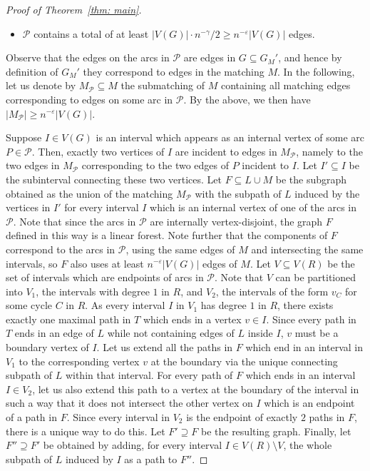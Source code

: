 \documentclass[11pt,reqno]{article}
\newenvironment{claimproof}[1][\proofname]{\proof[#1]\renewcommand{\qedsymbol}{$\blacksquare$}}{\endproof}
\begin{document}
\begin{proof}[Proof of Theorem~\ref{thm: main}]
\begin{claimproof}
\begin{itemize}
        \item $\mathcal P$ contains a total of at least $|V(G)|\cdot n^{-\gamma}/2\geq n^{-\varepsilon}|V(G)|$ edges.
    \end{itemize}
    Observe that the edges on the arcs in $\mathcal{P}$ are edges in $G\subseteq G_M'$, and hence by definition of $G_M'$ they correspond to edges in the matching $M$. In the following, let us denote by $M_{\mathcal P}\subseteq M$ the submatching of $M$ containing all matching edges corresponding to edges on some arc in $\mathcal P$. By the above, we then have $|M_\mathcal P|\ge n^{-\varepsilon} |V(G)|$.

    Suppose $I\in V(G)$ is an interval which appears as an internal vertex of some arc $P\in\mathcal P$. Then, exactly two vertices of $I$ are incident to edges in $M_{\mathcal P}$, namely to the two edges in $M_{\mathcal P}$ corresponding to the two edges of $P$ incident to $I$. Let $I'\subseteq I$ be the subinterval connecting these two vertices. Let $F\subseteq L\cup M$ be the subgraph obtained as the union of the matching $M_{\mathcal P}$ with the subpath of $L$ induced by the vertices in $I'$ for every interval $I$ which is an internal vertex of one of the arcs in $\mathcal P$. Note that since the arcs in $\mathcal P$ are internally vertex-disjoint, the graph $F$ defined in this way is a linear forest. Note further that the components of $F$ correspond to the arcs in $\mathcal P$, using the same edges of $M$ and intersecting the same intervals, so $F$ also uses at least $n^{-\varepsilon}|V(G)|$ edges of $M$. Let $V\subseteq V(R)$ be the set of intervals which are endpoints of arcs in $\mathcal P$. Note that $V$ can be partitioned into $V_1$, the intervals with degree $1$ in $R$, and $V_2$, the intervals of the form $v_C$ for some cycle $C$ in $R$. As every interval $I$ in $V_1$ has degree $1$ in $R$, there exists exactly one maximal path in $T$ which ends in a vertex $v\in I$. Since every path in $T$ ends in an edge of $L$ while not containing edges of $L$ inside $I$, $v$ must be a boundary vertex of $I$. Let us extend all the paths in $F$ which end in an interval in $V_1$ to the corresponding vertex $v$ at the boundary via the unique connecting subpath of $L$ within that interval. For every path of $F$ which ends in an interval $I\in V_2$, let us also extend this path to a vertex at the boundary of the interval in such a way that it does not intersect the other vertex on $I$ which is an endpoint of a path in $F$. Since every interval in $V_2$ is the endpoint of exactly $2$ paths in $F$, there is a unique way to do this. Let $F'\supseteq F$ be the resulting graph. Finally, let $F''\supseteq F'$ be obtained by adding, for every interval $I\in V(R)\setminus V$, the whole subpath of $L$ induced by $I$ as a path to $F''$. 


\end{claimproof}
\end{proof}
\end{document}
